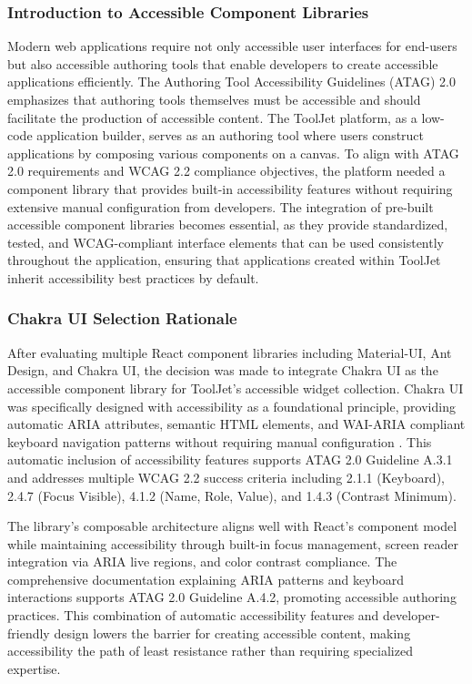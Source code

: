 \subsubsection{Introduction to Accessible Component Libraries}

Modern web applications require not only accessible user interfaces for end-users but also accessible authoring tools that enable developers to create accessible applications efficiently. The Authoring Tool Accessibility Guidelines (ATAG) 2.0 \cite{ATAG20} emphasizes that authoring tools themselves must be accessible and should facilitate the production of accessible content. The ToolJet platform, as a low-code application builder, serves as an authoring tool where users construct applications by composing various components on a canvas. To align with ATAG 2.0 requirements and WCAG 2.2 \cite{WCAG22} compliance objectives, the platform needed a component library that provides built-in accessibility features without requiring extensive manual configuration from developers. The integration of pre-built accessible component libraries becomes essential, as they provide standardized, tested, and WCAG-compliant interface elements that can be used consistently throughout the application, ensuring that applications created within ToolJet inherit accessibility best practices by default.

\subsubsection{Chakra UI Selection Rationale}

After evaluating multiple React component libraries including Material-UI, Ant Design, and Chakra UI, the decision was made to integrate Chakra UI \cite{chakraui} as the accessible component library for ToolJet's accessible widget collection. Chakra UI was specifically designed with accessibility as a foundational principle, providing automatic ARIA attributes, semantic HTML elements, and WAI-ARIA compliant keyboard navigation patterns without requiring manual configuration \cite{chakraui}. This automatic inclusion of accessibility features supports ATAG 2.0 Guideline A.3.1 and addresses multiple WCAG 2.2 \cite{WCAG22} success criteria including 2.1.1 (Keyboard), 2.4.7 (Focus Visible), 4.1.2 (Name, Role, Value), and 1.4.3 (Contrast Minimum).

The library's composable architecture aligns well with React's component model while maintaining accessibility through built-in focus management, screen reader integration via ARIA live regions, and color contrast compliance. The comprehensive documentation \cite{chakraui} explaining ARIA patterns and keyboard interactions supports ATAG 2.0 Guideline A.4.2, promoting accessible authoring practices. This combination of automatic accessibility features and developer-friendly design lowers the barrier for creating accessible content, making accessibility the path of least resistance rather than requiring specialized expertise.

